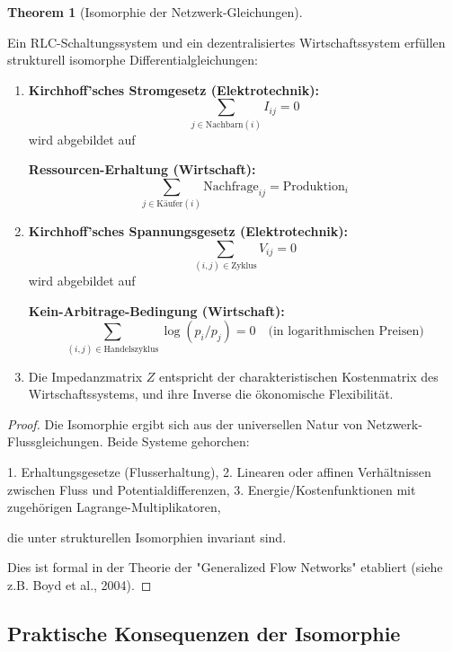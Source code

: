 \documentclass[a4paper,12pt]{article}
\theoremstyle{definition}
\newtheorem{theorem}{Theorem}
\begin{document}
\begin{theorem}[Isomorphie der Netzwerk-Gleichungen]
\label{thm:isomorphie_netzwerk}

Ein RLC-Schaltungssystem und ein dezentralisiertes Wirtschaftssystem erfüllen strukturell isomorphe Differentialgleichungen:

\begin{enumerate}
\item \textbf{Kirchhoff'sches Stromgesetz (Elektrotechnik):}
\[
\sum_{j \in \text{Nachbarn}(i)} I_{ij} = 0
\]
wird abgebildet auf

\textbf{Ressourcen-Erhaltung (Wirtschaft):}
\[
\sum_{j \in \text{Käufer}(i)} \text{Nachfrage}_{ij} = \text{Produktion}_i
\]

\item \textbf{Kirchhoff'sches Spannungsgesetz (Elektrotechnik):}
\[
\sum_{(i,j) \in \text{Zyklus}} V_{ij} = 0
\]
wird abgebildet auf

\textbf{Kein-Arbitrage-Bedingung (Wirtschaft):}
\[
\sum_{(i,j) \in \text{Handelszyklus}} \log(p_i / p_j) = 0 \quad \text{(in logarithmischen Preisen)}
\]

\item Die Impedanzmatrix $Z$ entspricht der charakteristischen Kostenmatrix des Wirtschaftssystems, und ihre Inverse die ökonomische Flexibilität.
\end{enumerate}

\end{theorem}

\begin{proof}

Die Isomorphie ergibt sich aus der universellen Natur von Netzwerk-Flussgleichungen. Beide Systeme gehorchen:

1. Erhaltungsgesetze (Flusserhaltung),
2. Linearen oder affinen Verhältnissen zwischen Fluss und Potentialdifferenzen,
3. Energie/Kostenfunktionen mit zugehörigen Lagrange-Multiplikatoren,

die unter strukturellen Isomorphien invariant sind.

Dies ist formal in der Theorie der "Generalized Flow Networks" etabliert (siehe z.B. Boyd et al., 2004).

\end{proof}

\subsection{Praktische Konsequenzen der Isomorphie}
\end{document}
